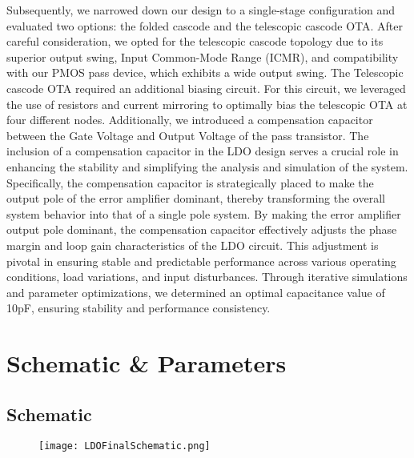 \documentclass{report}
\begin{document}
    Subsequently, we narrowed down our design to a single-stage configuration and evaluated two options: the folded cascode and the telescopic cascode OTA. After careful consideration, we opted for the telescopic cascode topology due to its superior output swing, Input Common-Mode Range (ICMR), and compatibility with our PMOS pass device, which exhibits a wide output swing. The Telescopic cascode OTA required an additional biasing circuit. For this circuit, we leveraged the use of resistors and current mirroring to optimally bias the telescopic OTA at four different nodes. Additionally, we introduced a compensation capacitor between the Gate Voltage and Output Voltage of the pass transistor. The inclusion of a compensation capacitor in the LDO design serves a crucial role in enhancing the stability and simplifying the analysis and simulation of the system. Specifically, the compensation capacitor is strategically placed to make the output pole of the error amplifier dominant, thereby transforming the overall system behavior into that of a single pole system. By making the error amplifier output pole dominant, the compensation capacitor effectively adjusts the phase margin and loop gain characteristics of the LDO circuit. This adjustment is pivotal in ensuring stable and predictable performance across various operating conditions, load variations, and input disturbances. Through iterative simulations and parameter optimizations, we determined an optimal capacitance value of 10pF, ensuring stability and performance consistency.

    \chapter{Schematic \& Parameters}
    \section{Schematic}

    \begin{figure}[ht!]
        \centering
        \begin{minipage}[b]{0.8\linewidth}
            \centering
            \texttt{[image: LDOFinalSchematic.png]}
            \label{fig:LDOSchematic}
        \end{minipage}
    \end{figure}
\end{document}
